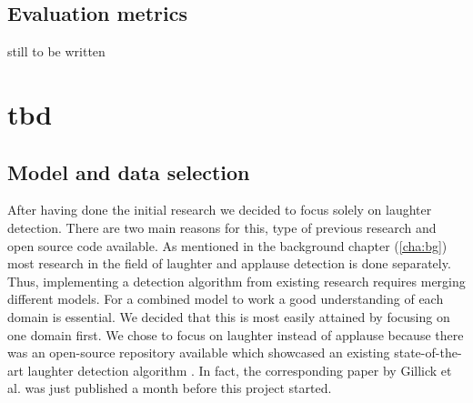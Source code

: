 \documentclass[bsc,frontabs,parskip,deptreport]{infthesis}
\begin{document}
\section{Evaluation metrics} \label{theory}
still to be written


\chapter{tbd} 

\section{Model and data selection}\label{sec:model-and-data}
After having done the initial research we decided to focus solely on laughter detection. 
There are two main reasons for this, type of previous research and open source code available.  
As mentioned in the background chapter (\ref{cha:bg}) most research in the field of laughter and applause detection is done separately. 
Thus, implementing a detection algorithm from existing research requires merging different models. 
For a combined model to work a good understanding of each domain is essential.
We decided that this is most easily attained by focusing on one domain first. 
We chose to focus on laughter instead of applause because there was an open-source repository available which showcased an existing state-of-the-art laughter detection algorithm \cite{gillick-codebase}.
In fact, the corresponding paper by Gillick et al. \cite{gillick2021robust} was just published a month before this project started.
\end{document}
